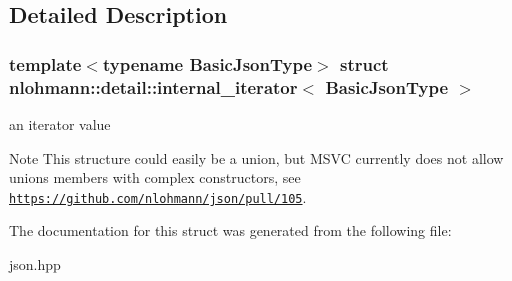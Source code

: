 \subsection{Detailed Description}
\subsubsection*{template$<$typename Basic\+Json\+Type$>$\newline
struct nlohmann\+::detail\+::internal\+\_\+iterator$<$ Basic\+Json\+Type $>$}

an iterator value 

\begin{DoxyNote}{Note}
This structure could easily be a union, but M\+S\+VC currently does not allow unions members with complex constructors, see \href{https://github.com/nlohmann/json/pull/105}{\tt https\+://github.\+com/nlohmann/json/pull/105}. 
\end{DoxyNote}


The documentation for this struct was generated from the following file\+:\begin{DoxyCompactItemize}
\item 
json.\+hpp\end{DoxyCompactItemize}
